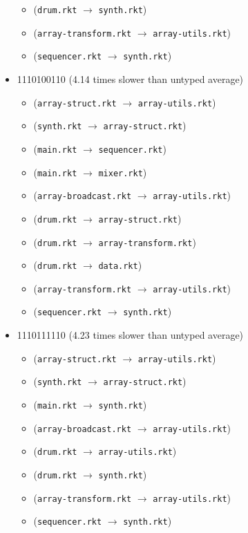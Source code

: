 \documentclass{article}
\newcommand{\mono}[1]{\texttt{#1}}
\begin{document}
\begin{itemize}
\begin{itemize}
  \item (\mono{drum.rkt} $\rightarrow$ \mono{synth.rkt})
  \item (\mono{array-transform.rkt} $\rightarrow$ \mono{array-utils.rkt})
  \item (\mono{sequencer.rkt} $\rightarrow$ \mono{synth.rkt})
  \end{itemize}
\item 1110100110 (4.14 times slower than untyped average)
  \begin{itemize}
  \item (\mono{array-struct.rkt} $\rightarrow$ \mono{array-utils.rkt})
  \item (\mono{synth.rkt} $\rightarrow$ \mono{array-struct.rkt})
  \item (\mono{main.rkt} $\rightarrow$ \mono{sequencer.rkt})
  \item (\mono{main.rkt} $\rightarrow$ \mono{mixer.rkt})
  \item (\mono{array-broadcast.rkt} $\rightarrow$ \mono{array-utils.rkt})
  \item (\mono{drum.rkt} $\rightarrow$ \mono{array-struct.rkt})
  \item (\mono{drum.rkt} $\rightarrow$ \mono{array-transform.rkt})
  \item (\mono{drum.rkt} $\rightarrow$ \mono{data.rkt})
  \item (\mono{array-transform.rkt} $\rightarrow$ \mono{array-utils.rkt})
  \item (\mono{sequencer.rkt} $\rightarrow$ \mono{synth.rkt})
  \end{itemize}
\item 1110111110 (4.23 times slower than untyped average)
  \begin{itemize}
  \item (\mono{array-struct.rkt} $\rightarrow$ \mono{array-utils.rkt})
  \item (\mono{synth.rkt} $\rightarrow$ \mono{array-struct.rkt})
  \item (\mono{main.rkt} $\rightarrow$ \mono{synth.rkt})
  \item (\mono{array-broadcast.rkt} $\rightarrow$ \mono{array-utils.rkt})
  \item (\mono{drum.rkt} $\rightarrow$ \mono{array-utils.rkt})
  \item (\mono{drum.rkt} $\rightarrow$ \mono{synth.rkt})
  \item (\mono{array-transform.rkt} $\rightarrow$ \mono{array-utils.rkt})
  \item (\mono{sequencer.rkt} $\rightarrow$ \mono{synth.rkt})

\end{itemize}
\end{itemize}
\end{document}
